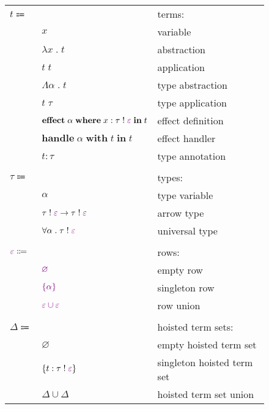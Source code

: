 \documentclass[12pt]{article}
\newcommand\anno[2]{#1 : #2}
\newcommand\term{t}
\newcommand\eVar{x}
\newcommand\eAbs[2]{\lambda #1 \; . \; #2}
\newcommand\eApp[2]{#1 \; #2}
\newcommand\eTAbs[2]{\Lambda #1 \; . \; #2}
\newcommand\eTApp[2]{#1 \; #2}
\newcommand\eHandle[3]{\textbf{handle} \; #1 \; \textbf{with} \; #2 \; \textbf{in} \; #3}
\newcommand\eEffect[5]{\textbf{effect} \; #1 \; \textbf{where} \; \anno{#2}{\tEmbellished{#3}{#4}} \; \textbf{in} \; #5}
\newcommand\eAnno[2]{\anno{#1}{#2}}
\newcommand\type{\tau}
\newcommand\tVar{\alpha}
\newcommand\tArrow[4]{\tEmbellished{#1}{#2} \rightarrow \tEmbellished{#3}{#4}}
\newcommand\tForall[3]{\forall #1 \; . \; \tEmbellished{#2}{#3}}
\newcommand\tEmbellished[2]{#1 \; ! \; \colorRow{#2}}
\newcommand\colorRow[1]{\textcolor{violet}{#1}}
\newcommand\row{\varepsilon}
\newcommand\rEmpty{\varnothing}
\newcommand\rSingleton[1]{\left\{ #1 \right\}}
\newcommand\rUnion[2]{#1 \cup #2}
\newcommand\hoistedSet{\Delta}
\newcommand\hSingleton[3]{\left\{ \anno{#1}{\tEmbellished{#2}{#3}} \right\}}
\newcommand\hEmpty{\varnothing}
\newcommand\hUnion[2]{#1 \cup #2}
\begin{document}
        \begin{figure}[H]
          \begin{mdframed}[backgroundcolor=none]
            \begin{center}
              \begin{tabular}{l l l}
                $\term \Coloneqq$ & & terms: \\
                & $\eVar$ & variable \\
                & $\eAbs{\eVar}{\term}$ & abstraction \\
                & $\eApp{\term}{\term}$ & application \\
                & $\eTAbs{\tVar}{\term}$ & type abstraction \\
                & $\eTApp{\term}{\type}$ & type application \\
                & $\eEffect{\tVar}{\eVar}{\type}{\row}{\term}$ & effect definition \\
                & $\eHandle{\tVar}{\term}{\term}$ & effect handler \\
                & $\eAnno{\term}{\type}$ & type annotation \\
                \\
                $\type \Coloneqq$ & & types: \\
                & $\tVar$ & type variable \\
                & $\tArrow{\type}{\row}{\type}{\row}$ & arrow type \\
                & $\tForall{\tVar}{\type}{\row}$ & universal type \\
                \\
                $\colorRow{\row} \Coloneqq$ & & rows: \\
                & $\colorRow{\rEmpty}$ & empty row \\
                & $\colorRow{\rSingleton{\tVar}}$ & singleton row \\
                & $\colorRow{\rUnion{\row}{\row}}$ & row union \\
                \\
                $\hoistedSet \Coloneqq$ & & hoisted term sets: \\
                & $\hEmpty$ & empty hoisted term set \\
                & $\hSingleton{\term}{\type}{\row}$ & singleton hoisted term set \\
                & $\hUnion{\hoistedSet}{\hoistedSet}$ & hoisted term set union \\

\end{tabular}
\end{center}
\end{mdframed}
\end{figure}
\end{document}
